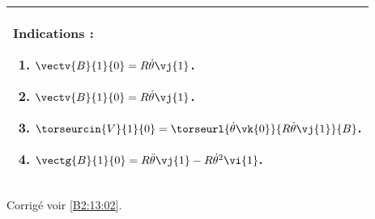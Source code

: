 \ifprof
\else
\footnotesize
\begin{center}
\begin{tabular}{|p{.9\linewidth}|}
\hline
Indications :
\begin{enumerate}
\item $\vectv{B}{1}{0}=R\dot{\theta}\vj{1}$.
\item $\vectv{B}{1}{0}=R\dot{\theta}\vj{1}$.
\item $\torseurcin{V}{1}{0} = \torseurl{\dot{\theta}\vk{0}}{R\dot{\theta}\vj{1}}{B}$.
\item  $\vectg{B}{1}{0} = R\ddot{\theta}\vj{1}-R\dot{\theta}^2\vi{1}$.
\end{enumerate} \\ \hline
\end{tabular}
\end{center}
\normalsize

\begin{flushright}
\footnotesize{Corrigé  voir \ref{B2:13:02}.}
\end{flushright}%
\fi